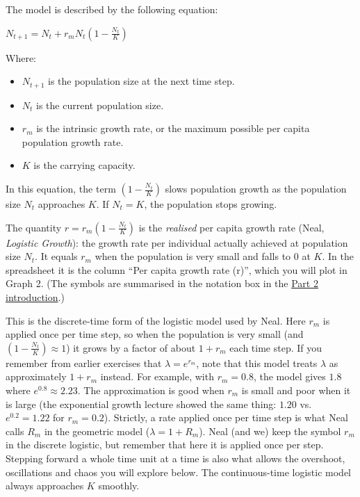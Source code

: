 \documentclass[
  a4paper]{book}
\providecommand{\tightlist}{%
  \setlength{\itemsep}{0pt}\setlength{\parskip}{0pt}}
\begin{document}
The model is described by the following equation:

\(N_{t+1} = N_{t} + r_{m} N_{t} \left(1 - \frac{N_{t}}{K}\right)\)

Where:

\begin{itemize}
\tightlist
\item
  \(N_{t+1}\) is the population size at the next time step.
\item
  \(N_t\) is the current population size.
\item
  \(r_m\) is the intrinsic growth rate, or the maximum possible per capita population growth rate.
\item
  \(K\) is the carrying capacity.
\end{itemize}

In this equation, the term \(\left(1 - \frac{N_t}{K}\right)\) slows population growth as the population size \(N_t\) approaches \(K\). If \(N_t = K\), the population stops growing.

The quantity \(r = r_m\left(1 - \frac{N_t}{K}\right)\) is the \emph{realised} per capita growth rate (Neal, \emph{Logistic Growth}): the growth rate per individual actually achieved at population size \(N_t\). It equals \(r_m\) when the population is very small and falls to 0 at \(K\). In the spreadsheet it is the column ``Per capita growth rate (r)'', which you will plot in Graph 2. (The symbols are summarised in the notation box in the \hyperref[part-2]{Part 2 introduction}.)

This is the discrete-time form of the logistic model used by Neal. Here \(r_m\) is applied once per time step, so when the population is very small (and \(\left(1 - \frac{N_t}{K}\right) \approx 1\)) it grows by a factor of about \(1 + r_m\) each time step. If you remember from earlier exercises that \(\lambda = e^{r_m}\), note that this model treats \(\lambda\) as approximately \(1 + r_m\) instead. For example, with \(r_m = 0.8\), the model gives \(1.8\) where \(e^{0.8} \approx 2.23\). The approximation is good when \(r_m\) is small and poor when it is large (the exponential growth lecture showed the same thing: \(1.20\) vs.~\(e^{0.2} = 1.22\) for \(r_m = 0.2\)). Strictly, a rate applied once per time step is what Neal calls \(R_m\) in the geometric model (\(\lambda = 1 + R_m\)). Neal (and we) keep the symbol \(r_m\) in the discrete logistic, but remember that here it is applied once per step. Stepping forward a whole time unit at a time is also what allows the overshoot, oscillations and chaos you will explore below. The continuous-time logistic model always approaches \(K\) smoothly.
\end{document}
